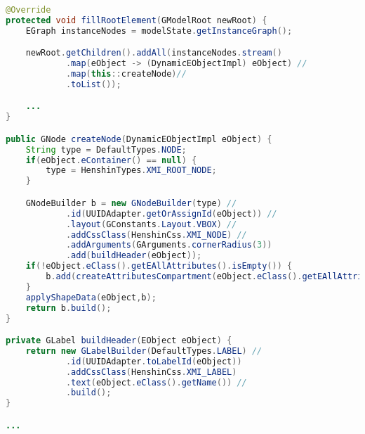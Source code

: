 \begin{lstlisting}[language=Java, caption={Parts of \code{XMIGModelFactory}}, label={lst:gmodel-factory}]
@Override
protected void fillRootElement(GModelRoot newRoot) {
    EGraph instanceNodes = modelState.getInstanceGraph();

    newRoot.getChildren().addAll(instanceNodes.stream()
            .map(eObject -> (DynamicEObjectImpl) eObject) //
            .map(this::createNode)//
            .toList());

    ...
}

public GNode createNode(DynamicEObjectImpl eObject) {
    String type = DefaultTypes.NODE;
    if(eObject.eContainer() == null) {
        type = HenshinTypes.XMI_ROOT_NODE;
    }

    GNodeBuilder b = new GNodeBuilder(type) //
            .id(UUIDAdapter.getOrAssignId(eObject)) //
            .layout(GConstants.Layout.VBOX) //
            .addCssClass(HenshinCss.XMI_NODE) //
            .addArguments(GArguments.cornerRadius(3))
            .add(buildHeader(eObject));
    if(!eObject.eClass().getEAllAttributes().isEmpty()) {
        b.add(createAttributesCompartment(eObject.eClass().getEAllAttributes(), eObject));
    }
    applyShapeData(eObject,b);
    return b.build();
}

private GLabel buildHeader(EObject eObject) {
    return new GLabelBuilder(DefaultTypes.LABEL) //
            .id(UUIDAdapter.toLabelId(eObject))
            .addCssClass(HenshinCss.XMI_LABEL)
            .text(eObject.eClass().getName()) //
            .build();
}

...
\end{lstlisting}